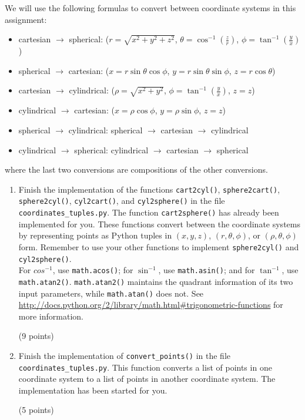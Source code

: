 \documentclass{article}
\newcounter{points}
\newcommand\setpoints[1]{\addtocounter{points}{#1}(#1 points)}
\begin{document}
\begin{enumerate}
We will use the following formulas to convert between coordinate systems in this assignment:

\begin{itemize}
\item{cartesian $\rightarrow$ spherical: ($r = \sqrt{x^2 + y^2 + z^2}$, $\theta = \cos^{-1}\left(\frac{z}{r}\right)$, $\phi = \tan^{-1}\left(\frac{y}{x}\right)$)}
\item{spherical $\rightarrow$ cartesian: ($x = r\sin\theta\cos\phi$, $y = r\sin\theta\sin\phi$, $z = r\cos\theta$)}
\item{cartesian $\rightarrow$ cylindrical: ($\rho = \sqrt{x^2 + y^2}$, $\phi = \tan^{-1}\left(\frac{y}{x}\right)$, $z = z$)}
\item{cylindrical $\rightarrow$ cartesian: ($x = \rho\cos\phi$, $y = \rho\sin\phi$, $z = z$)}
\item{spherical $\rightarrow$ cylindrical: spherical $\rightarrow$ cartesian $\rightarrow$ cylindrical}
\item{cylindrical $\rightarrow$ spherical: cylindrical $\rightarrow$ cartesian $\rightarrow$ spherical}
\end{itemize}

where the last two conversions are compositions of the other conversions.

\begin{enumerate}
\item Finish the implementation of the functions \texttt{cart2cyl()}, \texttt{sphere2cart()}, \texttt{sphere2cyl()}, \texttt{cyl2cart()}, and \texttt{cyl2sphere()} in the file \texttt{coordinates\_tuples.py}.  The function \texttt{cart2sphere()} has already been implemented for you.  These functions convert between the coordinate systems by representing points as Python tuples in $(x, y, z)$, $(r, \theta, \phi)$, or $(\rho, \theta, \phi)$ form. Remember to use your other functions to implement \texttt{sphere2cyl()} and \texttt{cyl2sphere()}. \\

For $cos^{-1}$, use \texttt{math.acos()}; for $\sin^{-1}$, use \texttt{math.asin()}; and for $\tan^{-1}$, use \texttt{math.atan2()}.  \texttt{math.atan2()} maintains the quadrant information of its two input parameters, while \texttt{math.atan()} does not.  See \url{http://docs.python.org/2/library/math.html#trigonometric-functions} for more information.  \setpoints{9}
\end{enumerate}

\begin{enumerate}
\setcounter{enumii}{1}
\item Finish the implementation of \texttt{convert\_points()} in the file \texttt{coordinates\_tuples.py}.  This function converts a list of points in one coordinate system to a list of points in another coordinate system.  The implementation has been started for you.  \setpoints{5}
\end{enumerate}


\end{enumerate}
\end{document}
